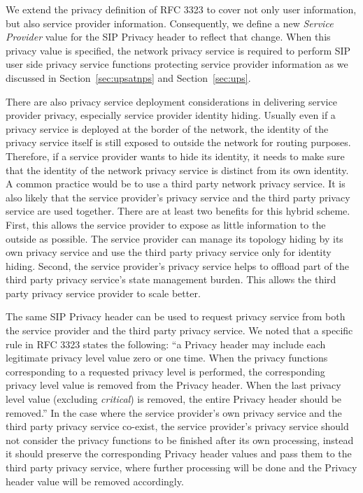 \documentclass[letterpaper,notitlepage,times,12pt]{article}
\begin{document}
We extend the privacy definition of RFC 3323 to cover not only user information, but also service provider information. Consequently, we define a new {\it Service Provider} value for the SIP {\sf Privacy} header to reflect that change. When this privacy value is specified, the network privacy service is required to perform SIP user side privacy service functions protecting service provider information as we discussed in Section~\ref{sec:upsatnps} and Section~\ref{sec:ups}.

There are also privacy service deployment considerations in delivering service provider privacy, especially service provider identity hiding. Usually even if a privacy service is deployed at the border of the network, the identity of the privacy service itself is still exposed to outside the network for routing purposes. Therefore, if a service provider wants to hide its identity, it needs to make sure that the identity of the network privacy service is distinct from its own identity. A common practice would be to use a third party network privacy service. It is also likely that the service provider's privacy service and the third party privacy service are used together. There are at least two benefits for this hybrid scheme. First, this allows the service provider to expose as little information to the outside as possible. The service provider can manage its topology hiding by its own privacy service and use the third party privacy service only for identity hiding. Second, the service provider's privacy service helps to offload part of the third party privacy service's state management burden. This allows the third party privacy service provider to scale better.





The same SIP {\sf Privacy} header can be used to request privacy service from both the service provider and the third party privacy service. We noted that a specific rule in RFC 3323 states the following: ``a {\sf Privacy} header may include each legitimate privacy level value zero or one time. When the privacy functions corresponding to a requested privacy level is performed, the corresponding privacy level value is removed from the {\sf Privacy} header. When the last privacy level value (excluding {\it critical}) is removed, the entire {\sf Privacy} header should be removed.'' In the case where the service provider's own privacy service and the third party privacy service co-exist, the service provider's privacy service should not consider the privacy functions to be finished after its own processing, instead it should preserve the corresponding {\sf Privacy} header values and pass them to the third party privacy service, where further processing will be done and the {\sf Privacy} header value will be removed accordingly.
\end{document}
